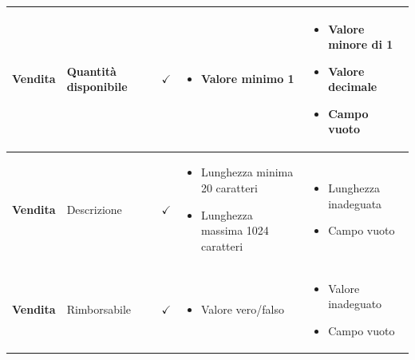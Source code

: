 \documentclass[12pt]{article}
\begin{document}
\begin{longtable}{|l|l|l|l|l|}
 \textbf{Vendita} & Quantità disponibile & $\checkmark$ & \begin{minipage}{3.5cm}
 \vspace{5pt}
 \begin{itemize}
 \item Valore minimo 1
 \end{itemize}
 \vspace{5pt}
 \end{minipage} & \begin{minipage}{4cm}
 \vspace{5pt}
 \begin{itemize}
 \item Valore minore di 1
 \item Valore decimale
 \item Campo vuoto
 \end{itemize}
 \vspace{5pt}
 \end{minipage} \\ \hline
 
 \textbf{Vendita} & Descrizione & $\checkmark$ & \begin{minipage}{3.5cm}
 \vspace{5pt}
 \begin{itemize}
 \item Lunghezza minima 20 caratteri
 \item Lunghezza massima 1024 caratteri
 \end{itemize}
 \vspace{5pt}
 \end{minipage} & \begin{minipage}{4cm}
 \vspace{5pt}
 \begin{itemize}
 \item Lunghezza inadeguata
 \item Campo vuoto
 \end{itemize}
 \vspace{5pt}
 \end{minipage} \\ \hline
 
 \textbf{Vendita} & Rimborsabile & $\checkmark$ & \begin{minipage}{3.5cm}
 \vspace{5pt}
 \begin{itemize}
 \item Valore vero/falso
 \end{itemize}
 \vspace{5pt}
 \end{minipage} & \begin{minipage}{4cm}
 \vspace{5pt}
 \begin{itemize}
 \item Valore inadeguato
 \item Campo vuoto
 \end{itemize}
 \vspace{5pt}
 \end{minipage} \\ \hline
 

\end{longtable}
\end{document}
